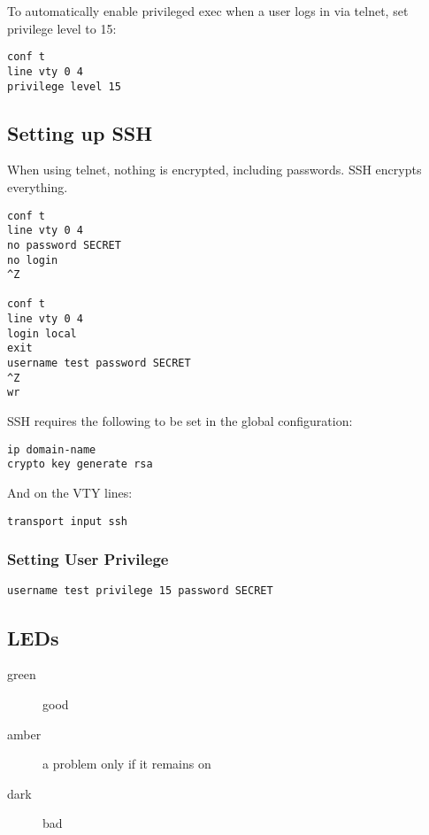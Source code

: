 To automatically enable privileged exec when a user logs in via telnet, set
privilege level to 15:

\begin{verbatim}
conf t
line vty 0 4
privilege level 15
\end{verbatim}

\subsection{Setting up SSH}

When using telnet, nothing is encrypted, including passwords. SSH encrypts
everything.

\begin{verbatim}
conf t
line vty 0 4
no password SECRET
no login
^Z

conf t
line vty 0 4
login local
exit
username test password SECRET
^Z
wr
\end{verbatim}

SSH requires the following to be set in the global configuration:

\begin{verbatim}
ip domain-name
crypto key generate rsa
\end{verbatim}

And on the VTY lines:

\begin{verbatim}
transport input ssh
\end{verbatim}

\subsubsection{Setting User Privilege}

\begin{verbatim}
username test privilege 15 password SECRET
\end{verbatim}

\subsection{LEDs}

\begin{description}

\item[green]
good

\item[amber]
a problem only if it remains on

\item[dark]
bad

\end{description}

